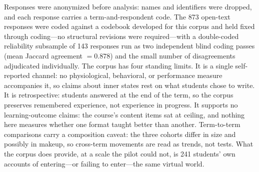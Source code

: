 Responses were anonymized before analysis: names and identifiers were dropped,
and each response carries a term-and-respondent code. The 873 open-text
responses were coded against a codebook developed for this corpus and held
fixed through coding---no structural revisions were required---with a
double-coded reliability subsample of 143 responses run as two independent
blind coding passes (mean Jaccard agreement $= 0.878$) and the small number of
disagreements adjudicated individually. The corpus has four standing limits.
It is a single self-reported channel: no physiological, behavioral, or
performance measure accompanies it, so claims about inner states rest on what
students chose to write. It is retrospective: students answered at the end of
the term, so the corpus preserves remembered experience, not experience in
progress. It supports no learning-outcome claims: the course's content items
sat at ceiling, and nothing here measures whether one format taught better than
another. Term-to-term comparisons carry a composition caveat: the three cohorts
differ in size and possibly in makeup, so cross-term movements are read as
trends, not tests. What the corpus does provide, at a scale the pilot could
not, is 241 students' own accounts of entering---or failing to enter---the same
virtual world.
